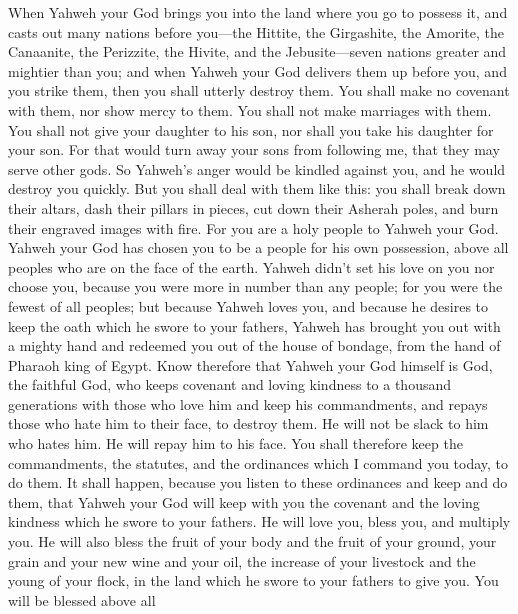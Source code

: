  When Yahweh your God brings you into the land where you
go to possess it, and casts out many nations before you---the Hittite,
the Girgashite, the Amorite, the Canaanite, the Perizzite, the Hivite,
and the Jebusite---seven nations greater and mightier than you;
 and when Yahweh your God delivers them up before you, and
you strike them, then you shall utterly destroy them. You shall make no
covenant with them, nor show mercy to them.  You shall not
make marriages with them. You shall not give your daughter to his son,
nor shall you take his daughter for your son.  For that
would turn away your sons from following me, that they may serve other
gods. So Yahweh's anger would be kindled against you, and he would
destroy you quickly.  But you shall deal with them like
this: you shall break down their altars, dash their pillars in pieces,
cut down their Asherah poles, and burn their engraved images with fire.
 For you are a holy people to Yahweh your God. Yahweh your
God has chosen you to be a people for his own possession, above all
peoples who are on the face of the earth.  Yahweh didn't
set his love on you nor choose you, because you were more in number than
any people; for you were the fewest of all peoples;  but
because Yahweh loves you, and because he desires to keep the oath which
he swore to your fathers, Yahweh has brought you out with a mighty hand
and redeemed you out of the house of bondage, from the hand of Pharaoh
king of Egypt.  Know therefore that Yahweh your God
himself is God, the faithful God, who keeps covenant and loving kindness
to a thousand generations with those who love him and keep his
commandments,  and repays those who hate him to their
face, to destroy them. He will not be slack to him who hates him. He
will repay him to his face.  You shall therefore keep the
commandments, the statutes, and the ordinances which I command you
today, to do them.  It shall happen, because you listen
to these ordinances and keep and do them, that Yahweh your God will keep
with you the covenant and the loving kindness which he swore to your
fathers.  He will love you, bless you, and multiply you.
He will also bless the fruit of your body and the fruit of your ground,
your grain and your new wine and your oil, the increase of your
livestock and the young of your flock, in the land which he swore to
your fathers to give you.  You will be blessed above all
